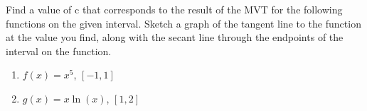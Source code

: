 \documentclass{ximera}
\begin{document}
\begin{exercise}
    Find a value of c that corresponds to the result of the MVT for the following functions on the given interval.  Sketch a graph of the tangent line to the function at the value you find, along with the secant line through the endpoints of the interval on the function.
   \begin{enumerate}
       \item $f(x)=x^5$, $[-1,1]$
       \item $g(x)=x\ln(x)$, $[1,2]$
   \end{enumerate}
\end{exercise}
\end{document}
